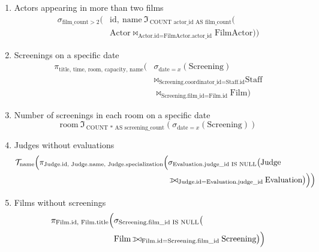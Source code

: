 \documentclass[12pt]{article}
\def\ojoin{%
  \rule[-.02ex]{.25em}{.4pt}\llap{\rule[.45em]{.25em}{.4pt}}}
\def\leftouterjoin{\mathbin{\ojoin\mkern-5.8mu\bowtie}}
\begin{document}
\begin{enumerate}
\item Actors appearing in more than two films
$$
\begin{aligned}
  \sigma_{\text{film\_count}>2}
  \Big(
    &\text{id},\ \text{name}\ 
    \Im_{\ \text{COUNT actor\_id 
    AS film\_count}}
    \Big(\\
      &\text{Actor}
      \Join_{\text{Actor.id} = 
      \text{FilmActor.actor\_id}}
      \text{FilmActor}
    \Big)
  \Big)
\end{aligned}
$$

\item Screenings on a specific date
$$
\begin{aligned}
  \pi_{\text{title, time, room, capacity, name}}
  \Big(
    &\sigma_{\text{date} = x}
    (\text{Screening})\\
    &\Join_{\text{Screening.coordinator\_id} = 
    \text{Staff.id}}
    \text{Staff}\\
    &\Join_{\text{Screening.film\_id} =
    \text{Film.id}}
    \text{Film}
  \Big)
\end{aligned}
$$

\item Number of screenings in each room on a specific date
$$
\text{room}\ 
\Im_{\ \text{COUNT * 
AS screening\_count}}
\left(
  \sigma_{\text{date} = x}
  (\text{Screening})
\right)
$$

\item Judges without evaluations
$$
\begin{aligned}
  \mathcal{T}_{\text{name}}
  \Big(
    \pi_{\text{Judge.id, Judge.name, Judge.specialization}}
    \Big(
      &\sigma_{\text{Evaluation.judge\_id 
      IS NULL}}
      \big(
        \text{Judge}\\
        &\leftouterjoin_{\text{Judge.id} = 
        \text{Evaluation.judge\_id}}
        \text{Evaluation}
      \big)
    \Big)
  \Big)
\end{aligned}
$$

\item Films without screenings
$$
\begin{aligned}
  \pi_{\text{Film.id, Film.title}}
  \Big(
    &\sigma_{\text{Screening.film\_id 
    IS NULL}}
    \big(\\
      &\text{Film}
      \leftouterjoin_{\text{Film.id} =
      \text{Screening.film\_id}}
      \text{Screening}
    \big)
  \Big)
\end{aligned}
$$

\end{enumerate}
\end{document}
